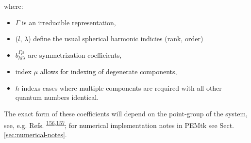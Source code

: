 \documentclass[10pt]{article}
\providecommand{\tightlist}{\setlength{\itemsep}{0pt}\setlength{\parskip}{0pt}}%
\begin{document}
where: 

\begin{itemize}
\item $\Gamma$ is an irreducible representation, 
\item ($l$, $\lambda$) define the usual spherical harmonic indicies (rank, order)
\item $b_{hl\lambda}^{\Gamma\mu}$ are symmetrization coefficients, 
\item index $\mu$ allows for indexing of degenerate components,
\item $h$ indexs cases where multiple components are required with all other quantum numbers identical. 
\end{itemize}
    
The exact form of these coefficients will depend on the point-group of the system, see, e.g. Refs. \textsuperscript{\hyperref[csl:156]{156},\hyperref[csl:157]{157}}; for numerical implementation notes in PEMtk see Sect. \ref{sec:numerical-notes}.


\end{document}
